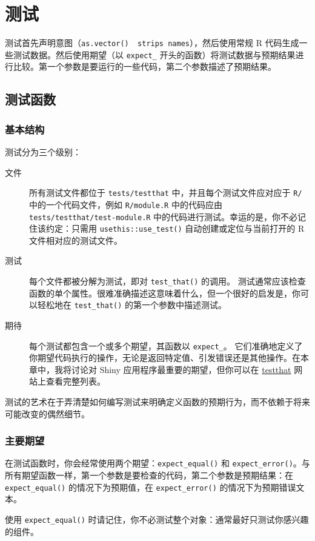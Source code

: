 \chapter{测试\label{ch21}}
测试首先声明意图（\verb|as.vector()  strips names|），然后使用常规 R 代码生成一些测试数据。然后使用期望（以 \verb|expect_| 开头的函数）将测试数据与预期结果进行比较。第一个参数是要运行的一些代码，第二个参数描述了预期结果。

\section{测试函数}
\subsection{基本结构}
测试分为三个级别：
\begin{description}
    \item[文件] 所有测试文件都位于 \verb|tests/testthat| 中，并且每个测试文件应对应于 \verb|R/| 中的一个代码文件，例如 \verb|R/module.R| 中的代码应由 \verb|tests/testthat/test-module.R| 中的代码进行测试。幸运的是，你不必记住该约定：只需用 \verb|usethis::use_test()| 自动创建或定位与当前打开的 R 文件相对应的测试文件。
    \item[测试] 每个文件都被分解为测试，即对 \verb|test_that()| 的调用。 测试通常应该检查函数的单个属性。很难准确描述这意味着什么，但一个很好的启发是，你可以轻松地在 \verb|test_that()| 的第一个参数中描述测试。
    \item[期待] 每个测试都包含一个或多个期望，其函数以 \verb|expect_|。 它们准确地定义了你期望代码执行的操作，无论是返回特定值、引发错误还是其他操作。在本章中，我将讨论对 Shiny 应用程序最重要的期望，但你可以在 \href{https://testthat.r-lib.org/reference/index.html#section-expectations}{testthat} 网站上查看完整列表。
\end{description}

测试的艺术在于弄清楚如何编写测试来明确定义函数的预期行为，而不依赖于将来可能改变的偶然细节。
\subsection{主要期望}
在测试函数时，你会经常使用两个期望：\verb|expect_equal()| 和 \verb|expect_error()|。与所有期望函数一样，第一个参数是要检查的代码，第二个参数是预期结果：在 \verb|expect_equal()| 的情况下为预期值，在 \verb|expect_error()| 的情况下为预期错误文本。

使用 \verb|expect_equal()| 时请记住，你不必测试整个对象：通常最好只测试你感兴趣的组件。

